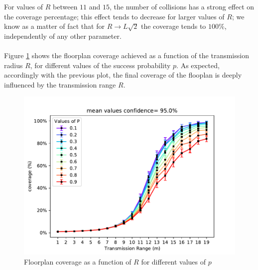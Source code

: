 \noindent
For values of $R$ between $11$ and $15$, the number of collisions has a strong
effect on the coverage percentage; this effect tends to decrease for larger
values of $R$; we know as a matter of fact that for $R \to L\sqrt{2}$ the
coverage tends to $100$\%, independently of any other parameter.\\
\\
Figure \ref{fig:coverageRP} shows the floorplan coverage achieved as a
function of the transmission radius $R$, for different values of the success probability $p$. As expected, accordingly with the previous plot, the
final coverage of the flooplan is deeply influenced by the transmission range $R$.
\begin{figure}[H]
    \begin{center}
        \includegraphics[scale=.75]{img/big_coverage_r_mean_95.0.pdf}
    \end{center}
    \vspace*{-0.5cm}
    \caption{Floorplan coverage as a function of $R$ for different values of $p$}
    \label{fig:coverageRP}
\end{figure}
\noindent

